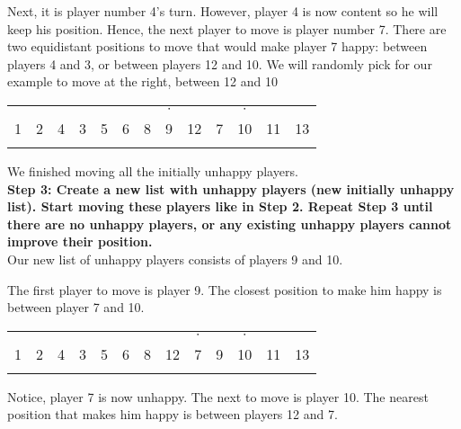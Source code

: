 \documentclass[../main.tex]{subfiles}
\begin{document}
Next, it is player number 4's turn. However, player 4 is now content so he will keep his position. Hence, the next player to move is player number 7. There are two equidistant positions to move that would make player 7 happy: between players 4 and 3, or between players 12 and 10. We will randomly pick for our example to move at the right, between 12 and 10

\begin{table}[H]
\begin{center}
{\begin{tabular}{| c |c| c| c| c |c| c |c| c |c|c|c|c|}
\hline
 & &  & & & &  & $\cdot$&   & &$\cdot$  &  &  \\
  1 & 2 &4 &3 &5 &6   &8 &9 & 12 &7& 10 & 11 & 13 \\
\x &\x &\x &\z &\z &\z  &\z &\x &\z & \x&\z &\x & \x\\
 \hline
\end{tabular}}
\end{center}
\end{table}

We finished moving all the initially unhappy players.\\

\textbf{Step 3:  Create a new list with unhappy players (new initially unhappy list). Start moving these players like in Step 2. Repeat Step 3 until there are no unhappy players, or any existing unhappy players cannot improve their position.} \\ 

Our new list of unhappy players consists of players 9 and 10.

The first player to move is player 9. The closest position to make him happy is between player 7 and 10.

\begin{table}[H]
\begin{center}
{\begin{tabular}{| c |c| c| c| c |c| c |c| c |c|c|c|c|}
\hline
 & &  & & & &  & &  $\cdot$ & &$\cdot$  &  &  \\
  1 & 2 &4 &3 &5 &6   &8  & 12 &7& 9&10 & 11 & 13 \\
\x &\x &\x &\z &\z &\z  &\z &\z &\x & \x&\z &\x & \x\\
 \hline
\end{tabular}}
\end{center}
\end{table}

Notice, player 7 is now unhappy. The next to move is player 10. The nearest position that makes him happy is between players 12 and 7.
\end{document}
